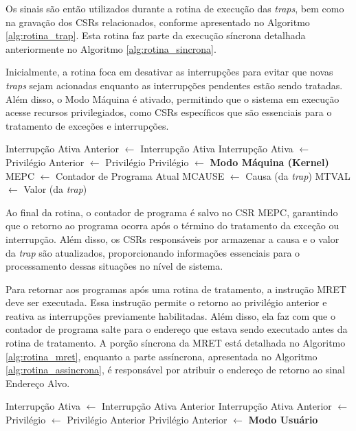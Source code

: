 \documentclass[
	12pt,				%
	openright,			%
	oneside,			%
	a4paper,			%
	english,			%
	french,				%
	spanish,			%
	brazil,				%
	]{abntex2}
\begin{document}
Os sinais são então utilizados durante a rotina de execução das \textit{traps}, bem como na gravação dos CSRs relacionados, conforme apresentado no Algoritmo \ref{alg:rotina_trap}. Esta rotina faz parte da execução síncrona detalhada anteriormente no Algoritmo \ref{alg:rotina_sincrona}.

Inicialmente, a rotina foca em desativar as interrupções para evitar que novas \textit{traps} sejam acionadas enquanto as interrupções pendentes estão sendo tratadas. Além disso, o Modo Máquina é ativado, permitindo que o sistema em execução acesse recursos privilegiados, como CSRs específicos que são essenciais para o tratamento de exceções e interrupções.

\begin{algorithm}[H]
\caption{Rotina de \textit{Trap} (Porção Síncrona)}
\label{alg:rotina_trap}
\begin{algorithmic}[1]
    \STATE Interrupção Ativa Anterior $\leftarrow$ Interrupção Ativa
    \STATE Interrupção Ativa $\leftarrow$ \FALSE
    \STATE Privilégio Anterior $\leftarrow$ Privilégio
    \STATE Privilégio $\leftarrow$ \textbf{Modo Máquina (Kernel)}
    \STATE MEPC $\leftarrow$ Contador de Programa Atual
    \STATE MCAUSE $\leftarrow$ Causa (da \textit{trap})
    \STATE MTVAL $\leftarrow$ Valor (da \textit{trap})
\end{algorithmic}
\end{algorithm}

Ao final da rotina, o contador de programa é salvo no CSR MEPC, garantindo que o retorno ao programa ocorra após o término do tratamento da exceção ou interrupção. Além disso, os CSRs responsáveis por armazenar a causa e o valor da \textit{trap} são atualizados, proporcionando informações essenciais para o processamento dessas situações no nível de sistema.

Para retornar aos programas após uma rotina de tratamento, a instrução MRET deve ser executada. Essa instrução permite o retorno ao privilégio anterior e reativa as interrupções previamente habilitadas. Além disso, ela faz com que o contador de programa salte para o endereço que estava sendo executado antes da rotina de tratamento. A porção síncrona da MRET está detalhada no Algoritmo \ref{alg:rotina_mret}, enquanto a parte assíncrona, apresentada no Algoritmo \ref{alg:rotina_assincrona}, é responsável por atribuir o endereço de retorno ao sinal Endereço Alvo.

\begin{algorithm}[h!]
\caption{Rotina do MRET (\textit{Machine Return}) (Porção Síncrona)}
\label{alg:rotina_mret}
\begin{algorithmic}[1]
    \STATE Interrupção Ativa $\leftarrow$ Interrupção Ativa Anterior
    \STATE Interrupção Ativa Anterior $\leftarrow$ \TRUE
    \STATE Privilégio $\leftarrow$ Privilégio Anterior
    \STATE Privilégio Anterior $\leftarrow$ \textbf{Modo Usuário}
\end{algorithmic}
\end{algorithm}
\end{document}
